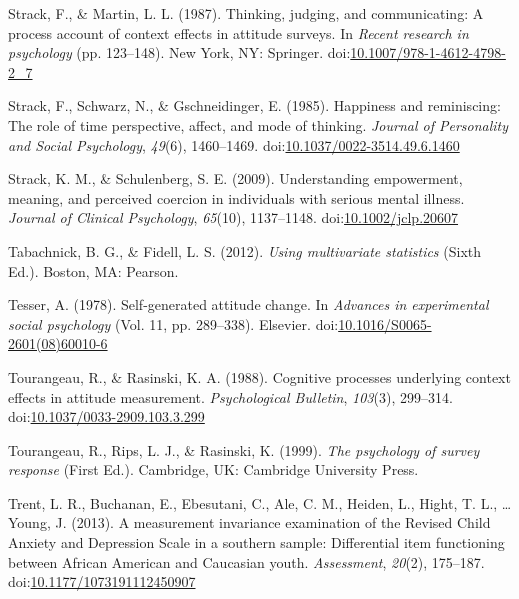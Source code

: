 \documentclass[english,man]{apa6}
\theoremstyle{definition}
\theoremstyle{definition}
\theoremstyle{definition}
\theoremstyle{remark}
\begin{document}
\hypertarget{ref-Strack1987}{}
Strack, F., \& Martin, L. L. (1987). Thinking, judging, and
communicating: A process account of context effects in attitude surveys.
In \emph{Recent research in psychology} (pp. 123--148). New York, NY:
Springer.
doi:\href{https://doi.org/10.1007/978-1-4612-4798-2_7}{10.1007/978-1-4612-4798-2\_7}

\hypertarget{ref-Strack1985}{}
Strack, F., Schwarz, N., \& Gschneidinger, E. (1985). Happiness and
reminiscing: The role of time perspective, affect, and mode of thinking.
\emph{Journal of Personality and Social Psychology}, \emph{49}(6),
1460--1469.
doi:\href{https://doi.org/10.1037/0022-3514.49.6.1460}{10.1037/0022-3514.49.6.1460}

\hypertarget{ref-Strack2009}{}
Strack, K. M., \& Schulenberg, S. E. (2009). Understanding empowerment,
meaning, and perceived coercion in individuals with serious mental
illness. \emph{Journal of Clinical Psychology}, \emph{65}(10),
1137--1148.
doi:\href{https://doi.org/10.1002/jclp.20607}{10.1002/jclp.20607}

\hypertarget{ref-Tabachnick2012}{}
Tabachnick, B. G., \& Fidell, L. S. (2012). \emph{Using multivariate
statistics} (Sixth Ed.). Boston, MA: Pearson.

\hypertarget{ref-Tesser1978}{}
Tesser, A. (1978). Self-generated attitude change. In \emph{Advances in
experimental social psychology} (Vol. 11, pp. 289--338). Elsevier.
doi:\href{https://doi.org/10.1016/S0065-2601(08)60010-6}{10.1016/S0065-2601(08)60010-6}

\hypertarget{ref-Tourangeau1988}{}
Tourangeau, R., \& Rasinski, K. A. (1988). Cognitive processes
underlying context effects in attitude measurement. \emph{Psychological
Bulletin}, \emph{103}(3), 299--314.
doi:\href{https://doi.org/10.1037/0033-2909.103.3.299}{10.1037/0033-2909.103.3.299}

\hypertarget{ref-Tourangeau1999}{}
Tourangeau, R., Rips, L. J., \& Rasinski, K. (1999). \emph{The
psychology of survey response} (First Ed.). Cambridge, UK: Cambridge
University Press.

\hypertarget{ref-Trent2013}{}
Trent, L. R., Buchanan, E., Ebesutani, C., Ale, C. M., Heiden, L.,
Hight, T. L., \ldots{} Young, J. (2013). A measurement invariance
examination of the Revised Child Anxiety and Depression Scale in a
southern sample: Differential item functioning between African American
and Caucasian youth. \emph{Assessment}, \emph{20}(2), 175--187.
doi:\href{https://doi.org/10.1177/1073191112450907}{10.1177/1073191112450907}
\end{document}
